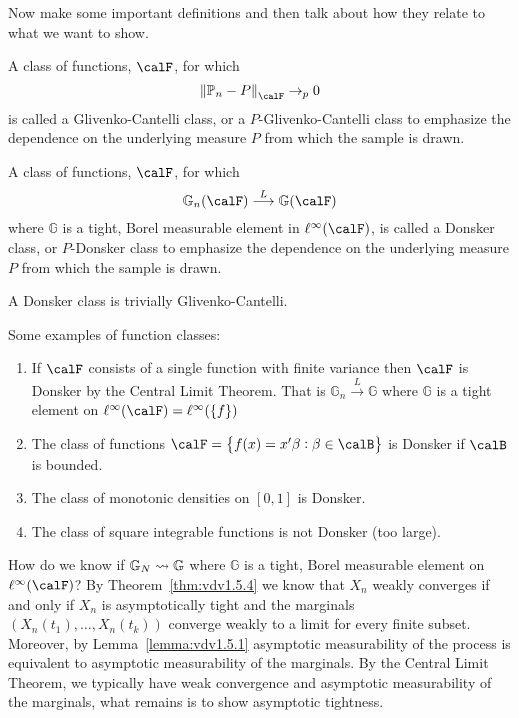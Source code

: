 Now make some important definitions and then talk about how they relate to what we want to show. 

\begin{definition}
	\label{def:gc-class}
	A class of functions, \(\calF\), for which
	\begin{equation}
		\label{eq:gc-def}
		\left\|\P_n-P\right\|_\calF \to_p 0
	\end{equation}
	is called a Glivenko-Cantelli class, or a \(P\)-Glivenko-Cantelli class to emphasize the dependence on the underlying measure \(P\) from which the sample is drawn.
\end{definition}

\begin{definition}
	\label{def:donsker-class}
	A class of functions, \(\calF\), for which
	 \begin{equation}
		\label{eq:donsker-def}
		\mathbb{G}_n(\calF) \overset{L}{\longrightarrow} \mathbb{G}(\calF)
	\end{equation}
	where \(\mathbb{G}\) is a tight, Borel measurable element in \(\ell^\infty(\calF)\), is called a Donsker class, or  \(P\)-Donsker class to emphasize the dependence on the underlying measure  \(P\) from which the sample is drawn.
\end{definition}

A Donsker class is trivially Glivenko-Cantelli. 

\begin{example}
	Some examples of function classes:
	\begin{enumerate}
		\item If \(\calF\) consists of a single function with finite variance then \(\calF\) is Donsker by the Central Limit Theorem. That is  \(\mathbb{G}_n \overset{L}{\to}\mathbb{G}\) where \(\mathbb{G}\) is a tight element on \(\ell^\infty(\calF) = \ell^\infty(\{f\} )\) 
		\item The class of functions \(\calF = \left\{f(x) = x'\beta: \beta \in \calB\right\} \) is Donsker if \(\calB\) is bounded. 
		\item The class of monotonic densities on \([0,1]\) is Donsker. 
		\item The class of square integrable functions is not Donsker (too large).
	\end{enumerate}	
\end{example}

How do we know if \(\mathbb{G}_N \rightsquigarrow \mathbb{G}\) where \(\mathbb{G}\) is a tight, Borel measurable element on \(\ell^\infty(\calF)\)? By Theorem~\ref{thm:vdv1.5.4} we know that \(X_n\) weakly converges if and only if \(X_n\) is asymptotically tight and the marginals  \(\left(X_n(t_1),\dots,X_n(t_k)\right)\) converge weakly to a limit for every finite subset. Moreover, by Lemma~\ref{lemma:vdv1.5.1} asymptotic measurability of the process is equivalent to asymptotic measurability of the marginals. By the Central Limit Theorem, we typically have weak convergence and asymptotic measurability of the marginals, what remains is to show asymptotic tightness. 

